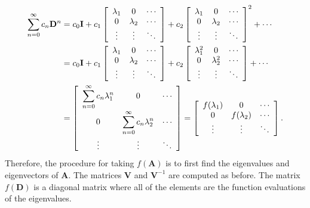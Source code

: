 \begin{align}
  \sum_{n=0}^\infty c_n \mathbf{D}^n &= 
  c_0 \mathbf{I} +
  c_1 \left[ \begin{array}{c c c}
  \lambda_1		& 0				& \cdots	\\
  0				& \lambda_2		& \cdots	\\
  \vdots		& \vdots		& \ddots	\\ \end{array} \right] +  
  c_2  \left[ \begin{array}{c c c}
  \lambda_1		& 0				& \cdots	\\
  0				& \lambda_2		& \cdots	\\
  \vdots		& \vdots		& \ddots	\\ \end{array} \right]^2 + \cdots \nonumber \\
  &= c_0 \mathbf{I} +
  c_1 \left[ \begin{array}{c c c}
  \lambda_1		& 0				& \cdots	\\
  0				& \lambda_2		& \cdots	\\
  \vdots		& \vdots		& \ddots	\\ \end{array} \right] +  
  c_2  \left[ \begin{array}{c c c}
  \lambda_1^2	& 0			& \cdots	\\
  0				& \lambda_2^2	& \cdots	\\
  \vdots		& \vdots		& \ddots	\\ \end{array} \right] + \cdots \nonumber \\
  &= \left[ \begin{array}{c c c}
  \displaystyle\sum_{n=0}^\infty c_n \lambda_1^n		& 0				& \cdots \vspace{0.2em}	\\
  0				& \displaystyle\sum_{n=0}^\infty c_n \lambda_2^n		& \cdots \vspace{0.2em}	\\
  \vdots		& \vdots		& \ddots	\\ \end{array} \right] 
  = \left[ \begin{array}{c c c}
  f(\lambda_1)		& 0			& \cdots 	\\
  0				& f(\lambda_2) 	& \cdots 	\\
  \vdots		& \vdots		& \ddots	\\ \end{array} \right] .
\end{align}
Therefore, the procedure for taking $f(\mathbf{A})$ is to first find the eigenvalues and eigenvectors of $\mathbf{A}$. The matrices $\mathbf{V}$ and $\mathbf{V}^{-1}$ are computed as before. The matrix $f(\mathbf{D})$ is a diagonal matrix where all of the elements are the function evaluations of the eigenvalues. 

